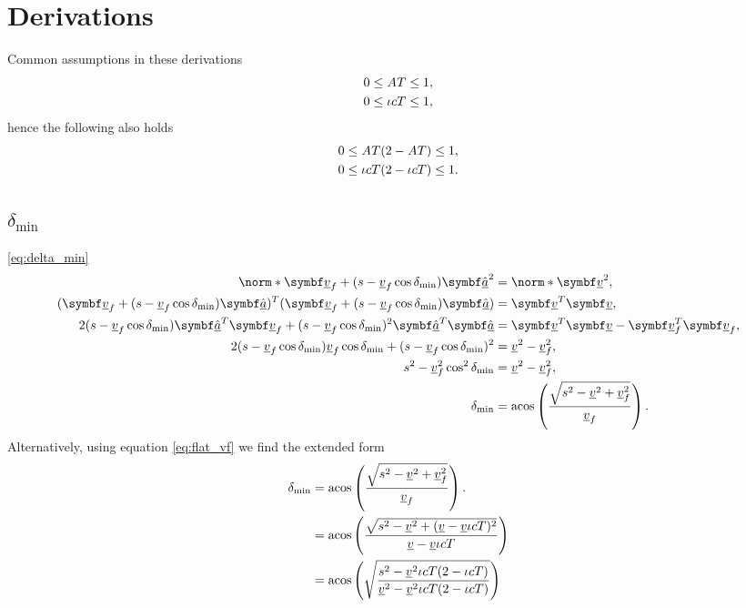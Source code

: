 \section{Derivations}
\label{app:derivations}
Common assumptions in these derivations
\begin{align}
\label{eq:assump_accel_1}
0 \le \mathmakebox[\widthof{$\iota c$}]{A}T \le 1,\\
\label{eq:assump_friction_1}
0 \le \iota cT \le 1,
\end{align}
hence the following also holds
\begin{align}
\label{eq:assump_accel_2}
0 \le \mathmakebox[\widthof{$\iota c$}]{A}T (2 - \mathmakebox[\widthof{$\iota c$}]{A} T) \le 1,\\
\label{eq:assump_friction_2}
0 \le \iota cT(2 - \iota cT) \le 1.
\end{align}


\subsection{\texorpdfstring{$\delta_{\min}$}{delta\_min}}
\eqref{eq:delta_min}
\begin{align*}
\norm*{\vec{\flat{v}}_f + (s - \flat{v}_f \cos\delta_{\min})\uvec{\flat{a}}}^2 &= \norm*{\vec{\flat{v}}}^2,\\
(\vec{\flat{v}}_f + (s - \flat{v}_f \cos\delta_{\min})\uvec{\flat{a}})^T (\vec{\flat{v}}_f + (s - \flat{v}_f \cos\delta_{\min})\uvec{\flat{a}}) &= \vec{\flat{v}}^T \vec{\flat{v}},\\
2(s - \flat{v}_f \cos\delta_{\min}) \uvec{\flat{a}}^T \vec{\flat{v}}_f + (s - \flat{v}_f \cos\delta_{\min})^2 \uvec{\flat{a}}^T \uvec{\flat{a}} &= \vec{\flat{v}}^T \vec{\flat{v}} - \vec{\flat{v}}_f^T \vec{\flat{v}}_f,\\
2(s - \flat{v}_f \cos\delta_{\min}) \flat{v}_f \cos\delta_{\min} + (s - \flat{v}_f \cos\delta_{\min})^2 &= \flat{v}^2 - \flat{v}_f^2,\\
s^2 - \flat{v}_f^2 \cos^2\delta_{\min} &= \flat{v}^2 - \flat{v}_f^2,\\
\delta_{\min} &= \acos\left(\frac{\sqrt{s^2 - \flat{v}^2 + \flat{v}_f^2}}{\flat{v}_f} \right).
\end{align*}
Alternatively, using equation \eqref{eq:flat_vf} we find the extended form
\begin{align*}
\delta_{\min} &= \acos\left(\frac{\sqrt{s^2 - \flat{v}^2 + \flat{v}_f^2}}{\flat{v}_f} \right).\\
&= \acos\left(\frac{\sqrt{s^2 - \flat{v}^2 + (\flat{v} - \flat{v}\iota cT)^2}}{\flat{v} - \flat{v}\iota cT} \right)\\
&= \acos\left(\sqrt{\frac{s^2 - \flat{v}^2\iota cT(2 - \iota cT)}{\flat{v}^2 - \flat{v}^2\iota cT(2 - \iota cT)}} \right)\\
\end{align*}

